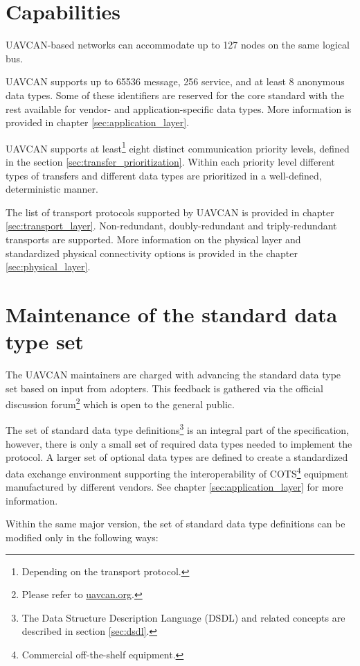 \section{Capabilities}

UAVCAN-based networks can accommodate up to 127 nodes on the same logical bus.

UAVCAN supports up to 65536 message, 256 service, and at least 8 anonymous data types.
Some of these identifiers are reserved for the core standard with 
the rest available for vendor- and application-specific data types.
More information is provided in chapter \ref{sec:application_layer}.

UAVCAN supports at least\footnote{Depending on the transport protocol.} eight distinct communication priority levels,
defined in the section \ref{sec:transfer_prioritization}.
Within each priority level different types of transfers and different data types are
prioritized in a well-defined, deterministic manner.

The list of transport protocols supported by UAVCAN is provided in chapter \ref{sec:transport_layer}.
Non-redundant, doubly-redundant and triply-redundant transports are supported.
More information on the physical layer and standardized physical connectivity options
is provided in the chapter \ref{sec:physical_layer}.

\section{Maintenance of the standard data type set}

The UAVCAN maintainers are charged with advancing the standard data type set based on input from adopters.
This feedback is gathered via the official discussion
forum\footnote{Please refer to \href{http://uavcan.org}{uavcan.org}.}
which is open to the general public.

The set of standard data type definitions\footnote{The Data Structure Description Language (DSDL) and related concepts are described in section \ref{sec:dsdl}.}
is an integral part of the specification, however, there is only a small set of required data types needed to implement the protocol.
A larger set of optional data types are defined to create a standardized data exchange environment
supporting the interoperability of COTS\footnote{Commercial off-the-shelf equipment.} equipment manufactured by different vendors.
See chapter \ref{sec:application_layer} for more information.


Within the same major version, the set of standard data type definitions can be modified only in the following ways:

